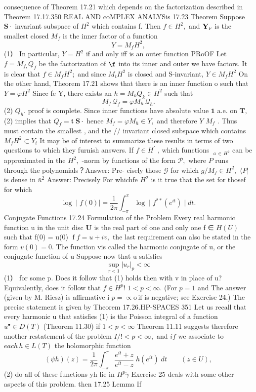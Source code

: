 consequence of Theorem 17.21 which depends on the factorization described in Theorem 17.17.350 REAL AND coMPLEX ANALYSis 17.23 Theorem Suppose ${\boldsymbol{S}}\cdot$ invariant subspace of $H^{2}$ which contains f. Then $f\in H^{2},$ and ${\bf Y_{\nu}}$ is the smallest closed $M_{f}$ is the inner factor of a function $$ \scriptstyle Y=M_{f}H^{2}, $$ (1） In particular, $Y=H^{2}$ if and only iff is an outer function PRoOF Let $f=M_{f,}Q_{f}$ be the factorization of $\boldsymbol{\f}$ into its inner and outer we have factors. It is clear that $f\in M_{f}H^{2};$ and since $M_{t}H^{2}$ is closed and S-invariant, $\scriptstyle Y\in M_{f}H^{2}$ On the other hand, Theorem 17.21 shows that there is an inner function o such that $Y=\varphi H^{2}$ Since fe Y, there exists an $h=M_{k}Q_{k}\in H^{2}$ such that $$ M_{f}\,\mathcal{Q}_{f}=\varphi M_{h}\,\mathcal{Q}_{h}. $$ (2) $Q_{h}.$ proof is complete. Since inner functions have absolute value $\mathbf{1}$ a.e. on ${\boldsymbol{T}},$ (2) implies that $\scriptstyle Q_{f}={\mathfrak{t}}$ ${\boldsymbol{S}}\cdot$ hence $M_{f}=\varphi M_{h}\in Y,$ and therefore ${\mathbf{}}Y$ $\textstyle{M_{f}}$ . Thus must contain the smallest , and the // invariant closed subspace which contains $M_{f}H^{2}\subset Y_{i}$ It may be of interest to summarize these results in terms of two questions to which they furnish answers. If $\scriptstyle f\in H^{\prime}$ , which functions $\;_{a\,\in\,H^{2}}$ can be approximated in the $H^{2},$ -norm by functions of the form ${\mathcal{P}},$ where ${\mathbf{}}P$ runs through the polynomials？Answer: Pre- cisely those $\scriptstyle{\mathcal{G}}$ for which $g/M_{f}\in H^{2},$ $\langle P|$ is dense in $\scriptstyle{\bar{u}}^{2}$ Answer: Precisely For whichfe $H^{2}$ is it true that the set for thosef for which $$ \log\mid f(0)\mid={\frac{1}{2\pi}}\int_{-\pi}^{\pi}\log\mid f^{**}(e^{i t})\mid d t. $$ Conjugate Functions 17.24 Formulation of the Problem Every real harmonic function u in the unit disc ${\boldsymbol{U}}$ is the real part of one and only one f ∈ $H(U)$ such that f(0) = u(0) $\operatorname{f}f=u+i v,$ the last requirement can also be stated in the form $v(0)=0.$ The function vis called the harmonic conjugate of u, or the conjugate function of u Suppose now that u satisfies $$ \operatorname*{sup}_{r<1}\left|u_{r}\right|_{p}<\infty $$ (1） for some p. Does it follow that (1) holds then with v in place of u? Equivalently, does it follow that $f\in H^{p}!$ $1<p<\infty.$ (For $\scriptstyle{p=1}$ and The answer (given by M. Riesz) is affirmative i $p=\propto\!\mathrm{{o}}\,\mathrm{{if}}$ is negative; see Exercise 24.) The precise statement is given by Theorem 17.26.HP-SPACES 351 Let us recall that every harmonic u that satisfies (1) is the Poisson integral of a function $u^{\bullet}\in D(T)$ (Theorem 11.30) if $1<p<\infty$ Theorem 11.11 suggests therefore another restatement of the problem $I/!<p<\infty,$ and $i f$ we associate to $e a c h\,h\in L(T)$ the holomorphic function $$ (\psi h)(z)=\frac{1}{2\pi}\int_{-\pi}^{\pi}\frac{e^{i t}+z}{e^{i t}-z}\;h(e^{i t})\;d t\qquad(z\in U), $$ (2) do all of these functions yh lie in $H^{p}{\dot{\gamma}}$ Exercise 25 deals with some other aspects of this problem. then 17.25 Lemma If 